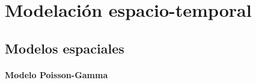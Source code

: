 \chapter{Modelación espacio-temporal} \label{chap:modeling}

\section{Modelos espaciales} \label{sec:spatial_models}

\subsubsection{Modelo Poisson-Gamma} \label{subsubsec:bayesian_poisson_gamma}

